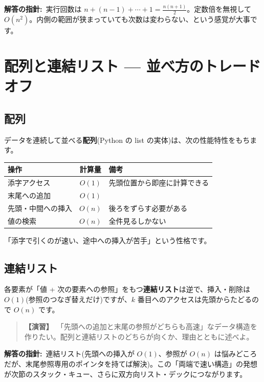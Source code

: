 \documentclass{article}
\begin{document}
\textbf{解答の指針:}\ 実行回数は \(n + (n-1) + \cdots + 1 = \frac{n(n+1)}{2}\)。定数倍を無視して \(O(n^2)\)。内側の範囲が狭まっていても次数は変わらない、という感覚が大事です。

\section{配列と連結リスト — 並べ方のトレードオフ}

\subsection{配列}

データを連続して並べる\textbf{配列}(Python の list の実体)は、次の性能特性をもちます。

\begin{center}
\begin{tabular}{|l|c|l|}
\hline
操作 & 計算量 & 備考 \\
\hline
添字アクセス & \(O(1)\) & 先頭位置から即座に計算できる \\
末尾への追加 & \(O(1)\) & \\
先頭・中間への挿入 & \(O(n)\) & 後ろをずらす必要がある \\
値の検索 & \(O(n)\) & 全件見るしかない \\
\hline
\end{tabular}
\end{center}

「添字で引くのが速い、途中への挿入が苦手」という性格です。

\subsection{連結リスト}

各要素が「値 + 次の要素への参照」をもつ\textbf{連結リスト}は逆で、挿入・削除は\(O(1)\)(参照のつなぎ替えだけ)ですが、\(k\) 番目へのアクセスは先頭からたどるので \(O(n)\) です。

\begin{quote}
\textbf{【演習】}\ 「先頭への追加と末尾の参照がどちらも高速」なデータ構造を作りたい。配列と連結リストのどちらが向くか、理由とともに述べよ。
\end{quote}

\textbf{解答の指針:}\ 連結リスト(先頭への挿入が \(O(1)\)、参照が \(O(n)\) は悩みどころだが、末尾参照専用のポインタを持てば解決)。この「両端で速い構造」の発想が次節のスタック・キュー、さらに双方向リスト・デックにつながります。
\end{document}
